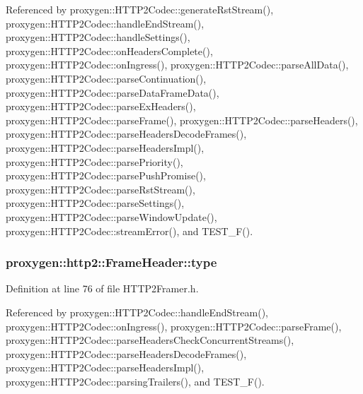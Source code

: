 Referenced by proxygen\+::\+H\+T\+T\+P2\+Codec\+::generate\+Rst\+Stream(), proxygen\+::\+H\+T\+T\+P2\+Codec\+::handle\+End\+Stream(), proxygen\+::\+H\+T\+T\+P2\+Codec\+::handle\+Settings(), proxygen\+::\+H\+T\+T\+P2\+Codec\+::on\+Headers\+Complete(), proxygen\+::\+H\+T\+T\+P2\+Codec\+::on\+Ingress(), proxygen\+::\+H\+T\+T\+P2\+Codec\+::parse\+All\+Data(), proxygen\+::\+H\+T\+T\+P2\+Codec\+::parse\+Continuation(), proxygen\+::\+H\+T\+T\+P2\+Codec\+::parse\+Data\+Frame\+Data(), proxygen\+::\+H\+T\+T\+P2\+Codec\+::parse\+Ex\+Headers(), proxygen\+::\+H\+T\+T\+P2\+Codec\+::parse\+Frame(), proxygen\+::\+H\+T\+T\+P2\+Codec\+::parse\+Headers(), proxygen\+::\+H\+T\+T\+P2\+Codec\+::parse\+Headers\+Decode\+Frames(), proxygen\+::\+H\+T\+T\+P2\+Codec\+::parse\+Headers\+Impl(), proxygen\+::\+H\+T\+T\+P2\+Codec\+::parse\+Priority(), proxygen\+::\+H\+T\+T\+P2\+Codec\+::parse\+Push\+Promise(), proxygen\+::\+H\+T\+T\+P2\+Codec\+::parse\+Rst\+Stream(), proxygen\+::\+H\+T\+T\+P2\+Codec\+::parse\+Settings(), proxygen\+::\+H\+T\+T\+P2\+Codec\+::parse\+Window\+Update(), proxygen\+::\+H\+T\+T\+P2\+Codec\+::stream\+Error(), and T\+E\+S\+T\+\_\+\+F().

\subsubsection[{type}]{ proxygen\+::http2\+::\+Frame\+Header\+::type}\label{structproxygen_1_1http2_1_1FrameHeader_a608bcd42466ce5f95b36e939c479fb38}


Definition at line 76 of file H\+T\+T\+P2\+Framer.\+h.



Referenced by proxygen\+::\+H\+T\+T\+P2\+Codec\+::handle\+End\+Stream(), proxygen\+::\+H\+T\+T\+P2\+Codec\+::on\+Ingress(), proxygen\+::\+H\+T\+T\+P2\+Codec\+::parse\+Frame(), proxygen\+::\+H\+T\+T\+P2\+Codec\+::parse\+Headers\+Check\+Concurrent\+Streams(), proxygen\+::\+H\+T\+T\+P2\+Codec\+::parse\+Headers\+Decode\+Frames(), proxygen\+::\+H\+T\+T\+P2\+Codec\+::parse\+Headers\+Impl(), proxygen\+::\+H\+T\+T\+P2\+Codec\+::parsing\+Trailers(), and T\+E\+S\+T\+\_\+\+F().

